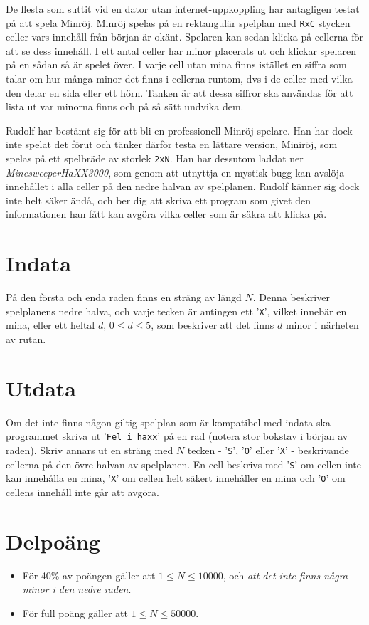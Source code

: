 De flesta som suttit vid en dator utan internet-uppkoppling har antagligen testat på att spela Minröj. Minröj spelas på en rektangulär spelplan med \texttt{RxC} stycken celler vars innehåll från början är okänt. Spelaren kan sedan klicka på cellerna för att se dess innehåll. I ett antal celler har minor placerats ut och klickar spelaren på en sådan så är spelet över. I varje cell utan mina finns istället en siffra som talar om hur många minor det finns i cellerna runtom, dvs i de celler med vilka den delar en sida eller ett hörn. Tanken är att dessa siffror ska användas för att lista ut var minorna finns och på så sätt undvika dem.

Rudolf har bestämt sig för att bli en professionell Minröj-spelare. Han har dock inte spelat det förut och tänker därför testa en lättare version, Miniröj, som spelas på ett spelbräde av storlek \texttt{2xN}. Han har dessutom laddat ner \emph{MinesweeperHaXX3000}, som genom att utnyttja en mystisk bugg kan avslöja innehållet i alla celler på den nedre halvan av spelplanen. Rudolf känner sig dock inte helt säker ändå, och ber dig att skriva ett program som givet den informationen han fått kan avgöra vilka celler som är säkra att klicka på.

\section*{Indata}
På den första och enda raden finns en sträng av längd $N$. Denna beskriver spelplanens nedre halva, och varje tecken är antingen ett '\texttt{X}', vilket innebär en mina, eller ett heltal $d$, $0 \leq d \leq 5$, som beskriver att det finns $d$ minor i närheten av rutan.

\section*{Utdata}
Om det inte finns någon giltig spelplan som är kompatibel med indata ska programmet skriva ut '\texttt{Fel i haxx}' på en rad (notera stor bokstav i början av raden). Skriv annars ut en sträng med $N$ tecken - '\texttt{S}', '\texttt{O}' eller '\texttt{X}' - beskrivande cellerna på den övre halvan av spelplanen. En cell beskrivs med '\texttt{S}' om cellen inte kan innehålla en mina, '\texttt{X}' om cellen helt säkert innehåller en mina och '\texttt{O}' om cellens innehåll inte går att avgöra.

\section*{Delpoäng}
\begin{itemize}
\item För 40\% av poängen gäller att $1 \leq N \leq 10 000$, och \emph{att det inte finns några minor i den nedre raden}.
\item För full poäng gäller att $1 \leq N \leq 50 000$.
\end{itemize}

